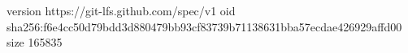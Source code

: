 version https://git-lfs.github.com/spec/v1
oid sha256:f6e4cc50d79bdd3d880479bb93cf83739b71138631bba57ecdae426929affd00
size 165835
